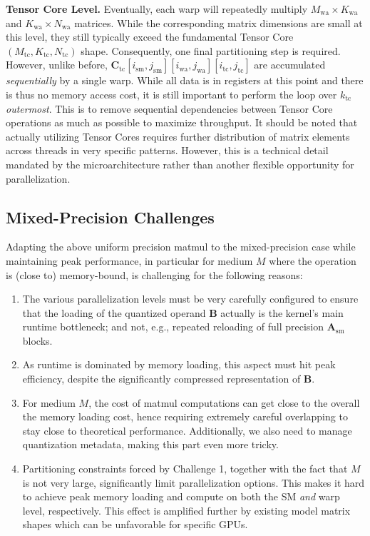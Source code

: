 \documentclass{article}
\theoremstyle{plain}
\theoremstyle{definition}
\theoremstyle{remark}
\renewcommand{\paragraph}[1]{\vspace{0.1em}\noindent\textbf{#1}}
\begin{document}
\paragraph{Tensor Core Level.} Eventually, each warp will repeatedly multiply $M_\text{wa} \times K_\text{wa}$ and $K_\text{wa} \times N_\text{wa}$ matrices. While the corresponding matrix dimensions are small at this level, they still typically exceed the fundamental Tensor Core $(M_\text{tc}, K_\text{tc}, N_\text{tc})$ shape. Consequently, one final partitioning step is required. However, unlike before, $\mathbf{C}_\text{tc}[i_\text{sm}, j_\text{sm}][i_\text{wa}, j_\text{wa}][i_\text{tc}, j_\text{tc}]$ are accumulated \emph{sequentially} by a single warp. While all data is in registers at this point and there is thus no memory access cost, it is still important to perform the loop over $k_\text{tc}$ \emph{outermost}. This is to remove sequential dependencies between Tensor Core operations as much as possible to maximize throughput. It should be noted that actually utilizing Tensor Cores requires further distribution of matrix elements across threads in very specific patterns. However, this is a technical detail mandated by the microarchitecture rather than another flexible opportunity for parallelization.

\subsection{Mixed-Precision Challenges}

Adapting the above uniform precision matmul to the mixed-precision case while maintaining peak performance, in particular for medium $M$ where the operation is (close to) memory-bound, is challenging for the following reasons:

\begin{enumerate}
    \item The various parallelization levels must be very carefully configured to ensure that the loading of the quantized operand $\mathbf{B}$ actually is the kernel's main runtime bottleneck; and not, e.g., repeated reloading of full precision $\mathbf{A}_\text{sm}$ blocks.
    \item As runtime is dominated by memory loading, this aspect must hit peak efficiency, despite the significantly compressed representation of $\mathbf{B}$.
    \item For medium $M$, the cost of matmul computations can get close to the overall the memory loading cost, hence requiring extremely careful overlapping to stay close to theoretical performance. Additionally, we also need to manage quantization metadata, making this part even more tricky.
    \item Partitioning constraints forced by Challenge 1, together with the fact that $M$ is not very large, significantly limit parallelization options. This makes it hard to achieve peak memory loading and compute on both the SM \emph{and} warp level, respectively. This effect is amplified further by existing model matrix shapes which can be unfavorable for specific GPUs.
\end{enumerate}
\end{document}
